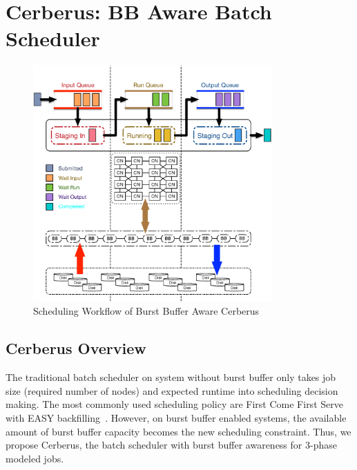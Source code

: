 \section{Cerberus: BB Aware Batch Scheduler}
\label{Sec:Scheduler}

\begin{figure}[!htbp]
        \centering
        \includegraphics[width=3.6in]{CerberusBBSystem}
        \caption{Scheduling Workflow of Burst Buffer Aware Cerberus}
        \label{Fig:CerberusQueues}
\end{figure}

\subsection{Cerberus Overview}

The traditional batch scheduler on system without burst buffer only
takes job size (required number of nodes) and expected runtime into scheduling decision making. 
The most commonly used scheduling policy are First Come First Serve with EASY backfilling~\cite{tsafrir-tpds-2007}.
However, on burst buffer enabled systems, 
the available amount of burst buffer capacity becomes the new scheduling constraint. 
Thus, we propose Cerberus, 
the batch scheduler with burst buffer awareness for 3-phase modeled jobs. 

